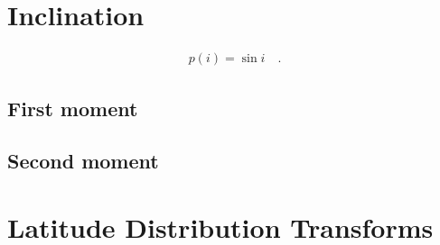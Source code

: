 \documentclass[modern]{aastex62}
\begin{document}
\section{Inclination}
\label{sec:inclination}

\begin{align}
    p(i) = \sin i
    \quad.
\end{align}

\subsection{First moment}

\subsection{Second moment}

\section{Latitude Distribution Transforms}
\end{document}
